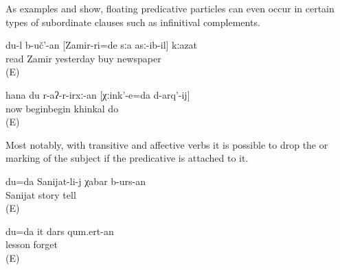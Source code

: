 As examples  and  show, floating predicative particles can even occur in certain types of subordinate clauses such as infinitival complements.
%
\begin{exe}
	\ex	\label{ex:I had to read the newspaper that ZAMIR bought yesterday@25a}
	\gll	du-l	b-uč'-an	[Zamir-ri=de	sːa	asː-ib-il]	kːazat\\
			read	Zamir	yesterday	buy	newspaper\\
	\glt	{} (E)

	\ex	\label{ex:Now I will / have to start to make KHINKAL@6}
	\gll	hana	du	r-aʔ-r-irxː-an	[χːink'-e=da	d-arq'-ij]\\
		now		beginbegin	khinkal	do\\
	\glt	{} (E)
\end{exe}

Most notably, with transitive and affective verbs it is possible to drop the  or  marking of the subject if the predicative  is attached to it.
%
\begin{exe}
	\ex	\label{ex:I will / have to tell Sanijat the story@8a}
	\gll	du=da	Sanijat-li-j	χabar	b-urs-an\\
			Sanijat	story	tell\\
	\glt	{} (E)

	\ex	\label{ex:I will not forget this lesson@8b}
	\gll	du=da	it	dars	qum.ert-an\\
				lesson	forget\\
	\glt	{} (E)
\end{exe}

